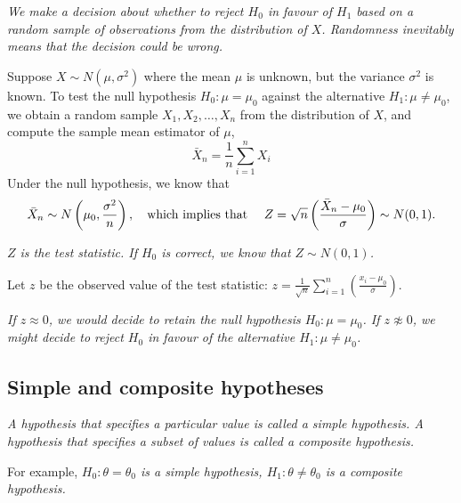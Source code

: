 \vspace*{1ex}
\bit
\it We make a decision about whether to reject $H_0$ in favour of $H_1$ based on a random sample of observations from the distribution of $X$.
\it Randomness inevitably means that the decision could be wrong.
\eit


\begin{example}[revision]
Suppose $X\sim N(\mu,\sigma^2)$ where the mean $\mu$ is unknown, but the variance $\sigma^2$ is known. To test the null hypothesis $H_0:\mu=\mu_0$ against the alternative $H_1:\mu\neq\mu_0$, we obtain a random sample $X_1,X_2,\ldots,X_n$ from the distribution of $X$, and compute the sample mean estimator of $\mu$,
\[
\bar{X}_n = \frac{1}{n}\sum_{i=1}^n X_i
\]
Under the null hypothesis, we know that
\[
\bar{X}_n \sim N\left(\mu_0, \frac{\sigma^2}{n}\right),
\text{\quad which implies that \quad}
Z = \sqrt{n}\left(\frac{\bar{X}_n-\mu_0}{\sigma}\right) \sim N(0,1).
\]

\bit
\it $Z$ is the test statistic. If $H_0$ is correct, we know that $Z\sim N(0,1)$.
\eit

Let $z$ be the observed value of the test statistic: $z=\displaystyle\frac{1}{\sqrt{n}}\sum_{i=1}^n \left(\frac{x_i-\mu_0}{\sigma}\right)$.

\bit
\it If $z\approx 0$, we would decide to retain the null hypothesis $H_0:\mu=\mu_0$.
\it If $z\not\approx 0$, we might decide to reject $H_0$ in favour of the alternative $H_1:\mu\neq\mu_0$.
\eit

\end{example}

\subsection{Simple and composite hypotheses}

\begin{definition}
\ben
\it A hypothesis that specifies a particular value is called a \emph{simple hypothesis}.
\it A hypothesis that specifies a subset of values is called a \emph{composite hypothesis}.
\een
\end{definition}

For example, 
\bit
\it $H_0:\theta = \theta_0$  is a simple hypothesis,
\it $H_1:\theta\neq\theta_0$ is a composite hypothesis.
\eit

